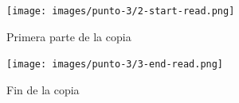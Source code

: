 \documentclass[12pt,journal,compsoc]{IEEEtran}
\begin{document}
\begin{figure}[H]
  \centering
  \texttt{[image: images/punto-3/2-start-read.png]}
  \caption{Primera parte de la copia}
  \label{fig:start-read}
\end{figure}

\begin{figure}[H]
  \centering
  \texttt{[image: images/punto-3/3-end-read.png]}
  \caption{Fin de la copia}
  \label{fig:end-read}
\end{figure}

\ifCLASSOPTIONcaptionsoff
  \newpage
\fi
\end{document}
